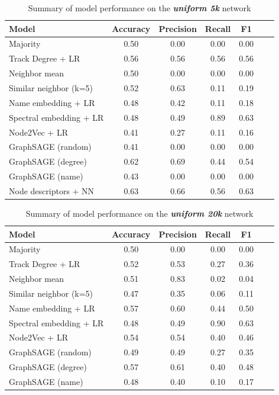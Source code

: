 \documentclass[9pt,twocolumn,twoside]{pnas-report}
\begin{document}
\begin{table}[htbp]
\centering
\begin{tabular}{lcccccc}
Model & Accuracy & Precision & Recall & F1 \\
\midrule
Majority & 0.50 & 0.00 & 0.00 & 0.00 \\
Track Degree + LR & 0.56 & 0.56 & 0.56 & 0.56 \\
Neighbor mean & 0.50 & 0.00 & 0.00 & 0.00 \\
Similar neighbor (k=5) & 0.52 & 0.63 & 0.11 & 0.19 \\
Name embedding + LR & 0.48 & 0.42 & 0.11 & 0.18 \\
Spectral embedding + LR & 0.48 & 0.49 & 0.89 & 0.63 \\
Node2Vec + LR & 0.41 & 0.27 & 0.11 & 0.16 \\
GraphSAGE (random) & 0.41 & 0.00 & 0.00 & 0.00 \\
GraphSAGE (degree) & 0.62 & 0.69 & 0.44 & 0.54 \\
GraphSAGE (name) & 0.43 & 0.00 & 0.00 & 0.00 \\
Node descriptors + NN & 0.63 & 0.66 & 0.56 & 0.63 \\

\bottomrule
\end{tabular}
\caption{Summary of model performance on the \textit{\textbf{uniform 5k}} network}
\label{tab:res-u5}
\end{table}

\begin{table}[htbp]
\centering
\begin{tabular}{lcccccc}
Model & Accuracy & Precision & Recall & F1 \\
\midrule
Majority & 0.50 & 0.00 & 0.00 & 0.00 \\
Track Degree + LR & 0.52 & 0.53 & 0.27 & 0.36 \\
Neighbor mean & 0.51 & 0.83 & 0.02 & 0.04 \\
Similar neighbor (k=5) & 0.47 & 0.35 & 0.06 & 0.11 \\
Name embedding + LR & 0.57 & 0.60 & 0.44 & 0.50 \\
Spectral embedding + LR & 0.48 & 0.49 & 0.90 & 0.63 \\
Node2Vec + LR & 0.54 & 0.54 & 0.40 & 0.46 \\
GraphSAGE (random) & 0.49 & 0.49 & 0.27 & 0.35 \\
GraphSAGE (degree) & 0.57 & 0.61 & 0.40 & 0.48 \\
GraphSAGE (name) & 0.48 & 0.40 & 0.10 & 0.17 \\
\bottomrule
\end{tabular}
\caption{Summary of model performance on the \textit{\textbf{uniform 20k}} network}
\label{tab:res-u20}
\end{table}
\end{document}

